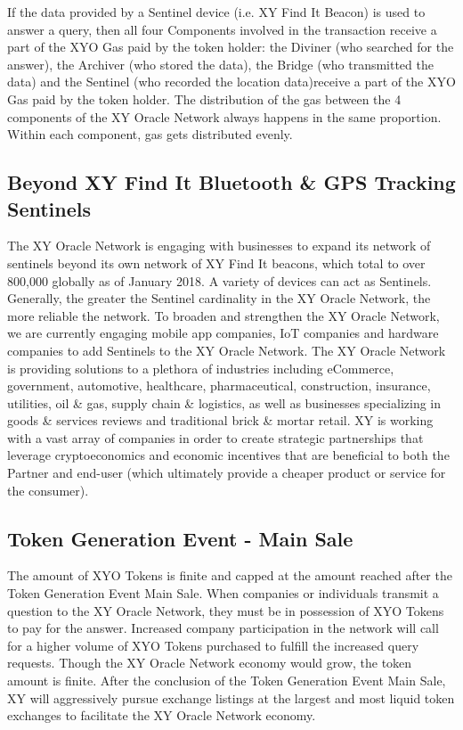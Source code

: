 \documentclass{article}
\begin{document}
If the data provided by a Sentinel device (i.e. XY Find It Beacon) is used to answer a query, then all four Components involved in the transaction receive a part of the XYO Gas paid by the token holder: the Diviner (who searched for the answer), the Archiver (who stored the data), the Bridge (who transmitted the data) and the Sentinel (who recorded the location data)receive a part of the XYO Gas paid by the token holder. The distribution of the gas between the 4 components of the XY Oracle Network always happens in the same proportion.  Within each component, gas gets distributed evenly.

\subsection {Beyond XY Find It Bluetooth \& GPS Tracking Sentinels}
The XY Oracle Network is engaging with businesses to expand its network of \Glspl{sentinel} beyond its own network of XY Find It beacons, which total to over 800,000 globally as of January 2018. A variety of devices can act as Sentinels. Generally, the greater the Sentinel cardinality in the XY Oracle Network, the more reliable the network. To broaden and strengthen the XY Oracle Network, we are currently engaging mobile app companies, IoT companies and hardware companies to add Sentinels to the XY Oracle Network. The XY Oracle Network is providing solutions to a plethora of industries including eCommerce, government, automotive, healthcare, pharmaceutical, construction, insurance, utilities, oil \& gas, supply chain \& logistics, as well as businesses specializing in goods \& services reviews and traditional brick \& mortar retail. XY is working with a vast array of companies in order to create strategic partnerships that leverage \gls{cryptoeconomics} and economic incentives that are beneficial to both the Partner and end-user (which ultimately provide a cheaper product or service for the consumer).

\subsection {Token Generation Event - Main Sale}
The amount of XYO Tokens is finite and capped at the amount reached after the Token Generation Event Main Sale. When companies or individuals transmit a question to the XY Oracle Network, they must be in possession of XYO Tokens to pay for the answer. Increased company participation in the network will call for a higher volume of XYO Tokens purchased to fulfill the increased query requests. Though the XY Oracle Network economy would grow, the token amount is finite. After the conclusion of the Token Generation Event Main Sale, XY will aggressively pursue exchange listings at the largest and most liquid token exchanges to facilitate the XY Oracle Network economy.
\end{document}
